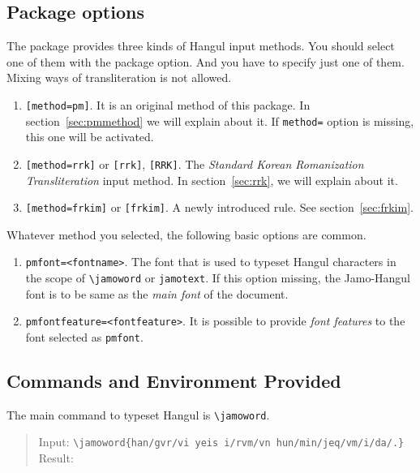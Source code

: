 \documentclass[a4paper]{article}
\providecommand*\textkorean[1]{#1}
\begin{document}
\subsection{Package options}

The package provides three kinds of Hangul input methods. 
You should select one of them with the package option.
And you have to specify just one of them. Mixing ways of transliteration is not
allowed.

\begin{enumerate}
\item \texttt{[method=pm]}. It is an original method of this package. In section~\ref{sec:pmmethod} we will explain about it. If \texttt{method=} option is missing, this one will be activated.
\item \texttt{[method=rrk]} or \texttt{[rrk]}, \texttt{[RRK]}. The \emph{Standard Korean Romanization Transliteration} input method.
In section~\ref{sec:rrk},
we will explain about it. 
\item \texttt{[method=frkim]} or \texttt{[frkim]}. A newly introduced rule. See section~\ref{sec:frkim}.
\end{enumerate}

Whatever method you selected, the following basic options are common.

\begin{enumerate}
\item \texttt{pmfont=<fontname>}. The font that is used to typeset Hangul 
characters in the scope of \verb|\jamoword| or \texttt{jamotext}. If this option missing, the Jamo-Hangul font is to be same as the \textit{main font} of 
the document.

\item \texttt{pmfontfeature=<fontfeature>}. It is possible to provide \emph{font features} to
the font selected as \texttt{pmfont}.
\end{enumerate}

\subsection{Commands and Environment Provided}

The main command to typeset Hangul is \verb|\jamoword|.

\begin{quote}
Input:
\verb|\jamoword{han/gvr/vi yeis i/rvm/vn hun/min/jeq/vm/i/da/.}|\\
Result: \textkorean{}
\end{quote}
\end{document}
